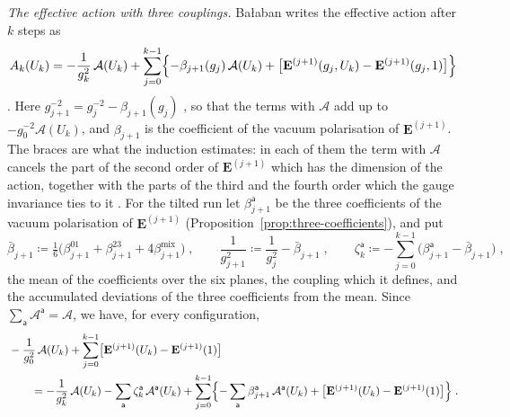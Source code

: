 \documentclass[11pt]{preprint}
\numberwithin{equation}{section}
\theoremstyle{definition}
\theoremstyle{remark}
\theoremstyle{plain}
\begin{document}
\emph{The effective action with three couplings.} Ba{\l}aban writes the effective action after $k$ steps as
\begin{equation}\label{eq:balaban-effective-action}
    A_k(U_k) = -\frac{1}{g_k^2}\,\mathcal A(U_k) + \sum_{j=0}^{k-1}\Bigl\{ -\beta_{j+1}(g_j)\,\mathcal A(U_k) + \bigl[\mathbf E^{(j+1)}(g_j, U_k) - \mathbf E^{(j+1)}(g_j, 1)\bigr]\Bigr\}
\end{equation}
\cite[(1.6), p.~261]{BalabanRG1}. Here $g_{j+1}^{-2} = g_j^{-2} - \beta_{j+1}(g_j)$ \cite[(0.20), p.~256]{BalabanRG1}, so that the terms with $\mathcal A$ add up to $-g_0^{-2}\mathcal A(U_k)$, and $\beta_{j+1}$ is the coefficient \cite[(1.22), p.~264]{BalabanRG1} of the vacuum polarisation of $\mathbf E^{(j+1)}$. The braces are what the induction estimates: in each of them the term with $\mathcal A$ cancels the part of the second order of $\mathbf E^{(j+1)}$ which has the dimension of the action, together with the parts of the third and the fourth order which the gauge invariance ties to it \cite[(4.38)--(4.45), pp.~291--292, and p.~298]{BalabanRG1}. For the tilted run let $\beta^{\mathsf a}_{j+1}$ be the three coefficients of the vacuum polarisation of $\mathbf E^{(j+1)}$ (Proposition~\ref{prop:three-coefficients}), and put
\begin{equation}\label{eq:three-couplings}
    \bar\beta_{j+1} \coloneqq \tfrac16\bigl(\beta^{01}_{j+1} + \beta^{23}_{j+1} + 4\beta^{\mathrm{mix}}_{j+1}\bigr)\;,
    \qquad
    \frac{1}{g_{j+1}^2} \coloneqq \frac{1}{g_j^2} - \bar\beta_{j+1}\;,
    \qquad
    \zeta^{\mathsf a}_k \coloneqq -\sum_{j=0}^{k-1}\bigl(\beta^{\mathsf a}_{j+1} - \bar\beta_{j+1}\bigr)\;,
\end{equation}
the mean of the coefficients over the six planes, the coupling which it defines, and the accumulated deviations of the three coefficients from the mean. Since $\sum_{\mathsf a}\mathcal A^{\mathsf a} = \mathcal A$, we have, for every configuration,
\begin{equation}\label{eq:three-coupling-action}
\begin{split}
    &-\frac{1}{g_0^2}\,\mathcal A(U_k) + \sum_{j=0}^{k-1}\bigl[\mathbf E^{(j+1)}(U_k) - \mathbf E^{(j+1)}(1)\bigr]\\
    &\qquad= -\frac{1}{g_k^2}\,\mathcal A(U_k) - \sum_{\mathsf a}\zeta^{\mathsf a}_k\,\mathcal A^{\mathsf a}(U_k) + \sum_{j=0}^{k-1}\Bigl\{ -\sum_{\mathsf a}\beta^{\mathsf a}_{j+1}\,\mathcal A^{\mathsf a}(U_k) + \bigl[\mathbf E^{(j+1)}(U_k) - \mathbf E^{(j+1)}(1)\bigr]\Bigr\}\;.
\end{split}
\end{equation}
\end{document}
